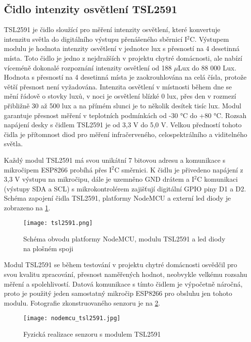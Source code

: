 \subsection{Čidlo intenzity osvětlení TSL2591}

TSL2591 je čidlo sloužící pro měření intenzity osvětlení, které konvertuje intenzitu světla do digitálního výstupu přenášeného sběrnicí I$^2$C. Výstupem modulu je hodnota intenzity osvětlení v jednotce \si{lux} s přesností na 4 desetinná místa. Toto čidlo je jedno z nejdražších v projektu chytré domácnosti, ale nabízí víceméně dokonalé rozpoznání intenzity osvětlení od 188 $\mu$Lux do 88 000 Lux. Hodnota s přesností na 4 desetinná místa je zaokrouhlována na celá čísla, protože větší přesnost není vyžadována. Intenzita osvětlení v místnosti během dne se mění řádově o stovky luxů, v noci je osvětlení blízké 0 \si{lux}, přes den v rozmezí přibližně 30 až 500 \si{lux} a na přímém slunci je to několik desítek tisíc \si{lux}. Modul garantuje přesnost měření v teplotních podmínkách od -30 \si{\degree}C do +80 \si{\degree}C. Rozsah napájení desky s čidlem TSL2591 je od 3,3 V do 5,0 V. Velkou předností tohoto čidla je přítomnost diod pro měření infračerveného, celospektrálního a viditelného světla. \par
Každý modul TSL2591 má svou unikátní 7 bitovou adresu a komunikace s mikročipem ESP8266 probíhá přes I$^2$C směrnici. K čidlu je přivedeno napájení z 3,3 V výstupu na mikročipu, dále je uzemněno GND drátem a I$^2$C komunikaci (výstupy SDA a SCL) s mikrokontrolérem zajišťují digitální GPIO piny D1 a D2. Schéma zapojení čidla TSL2591, platformy NodeMCU a externí led diody je zobrazeno na \cref{fig:schema_esp_tsl2591}.

\begin{figure}[H]
  \centering
  \texttt{[image: tsl2591.png]}
  \caption{Schéma obvodu platformy NodeMCU, modulu TSL2591 a led diody na plošném spoji}
  \label{fig:schema_esp_tsl2591}
\end{figure}

Modul TSL2591 se během testování v projektu chytré domácnosti osvědčil pro svou kvalitu zpracování, přesnost naměřených hodnot, neobvykle velkému rozsahu měření a spolehlivostí. Datová komunikace s tímto čidlem je výpočetně náročná, proto je použitý jeden samostatný mikročip ESP8266 pro obsluhu jen tohoto modulu. Fotografie zkonstruovaného senzoru je na \cref{fig:nodemcu_tsl2591}.

\begin{figure}[H]
  \centering
  \texttt{[image: nodemcu\_tsl2591.jpg]}
  \caption{Fyzická realizace senzoru s modulem TSL2591}
  \label{fig:nodemcu_tsl2591}
\end{figure} 

